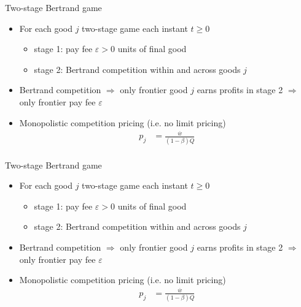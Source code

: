 \documentclass[english,usenames,dvipsnames]{beamer}
\begin{document}
\begin{frame}{Two-stage Bertrand game}\label{two_stage_bertrand2}
	\hyperlink{intermediate_goods_production}{}
	\begin{itemize}
		\item For each good $j$ two-stage game each instant $t \ge 0$
		\begin{itemize}
			\item stage 1: pay fee $\varepsilon > 0$ units of final good
			\item stage 2: Bertrand competition within and across goods $j$
		\end{itemize}
		\item Bertrand competition $\Rightarrow$ only frontier good $j$ earns profits in stage 2 $\Rightarrow$ only frontier pay fee $\varepsilon$
		\item Monopolistic competition pricing (i.e. no limit pricing)
		\begin{align*}
		p_j &= \frac{\overline{w}}{(1-\beta) Q} \\
		\end{align*}
	\end{itemize}
\end{frame}

\begin{frame}{Two-stage Bertrand game}\label{two_stage_bertrand}
	\hyperlink{closing_the_model}{}
	\begin{itemize}
		\item For each good $j$ two-stage game each instant $t \ge 0$
		\begin{itemize}
			\item stage 1: pay fee $\varepsilon > 0$ units of final good
			\item stage 2: Bertrand competition within and across goods $j$
		\end{itemize}
		\item Bertrand competition $\Rightarrow$ only frontier good $j$ earns profits in stage 2 $\Rightarrow$ only frontier pay fee $\varepsilon$
		\item Monopolistic competition pricing (i.e. no limit pricing)
		\begin{align*}
		p_j &= \frac{\overline{w}}{(1-\beta) Q} \\
		\end{align*}
	\end{itemize}
\end{frame}
\end{document}
